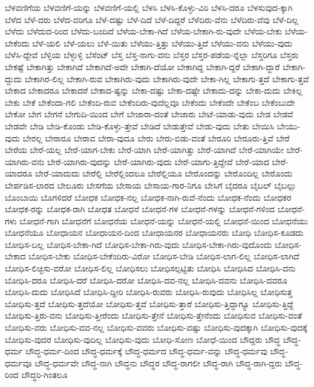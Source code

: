 {ಬೆಳವಣಿಗೆಯ
ಬೆಳವಣಿಗೆ-ಯನ್ನು
ಬೆಳವಣಿಗೆ-ಯಲ್ಲಿ
ಬೆಳಸಿ
ಬೆಳಸಿ-ಕೊಳ್ಳು-ವಿರಿ
ಬೆಳಸಿ-ದರೂ
ಬೆಳಸುವುದ-ಕ್ಕಾಗಿ
ಬೆಳೆದ
ಬೆಳೆ-ದರು
ಬೆಳೆದ-ವರಿಗೂ
ಬೆಳೆ-ದಷ್ಟು
ಬೆಳೆ-ದಿದೆ
ಬೆಳೆ-ದಿದ್ದರೆ
ಬೆಳೆದಿರು-ವೆನು
ಬೆಳೆದಿರು-ವೆವು
ಬೆಳೆ-ದಿಲ್ಲ
ಬೆಳೆದು
ಬೆಳೆದುದ-ರಿಂದ
ಬೆಳೆದು-ಬಂದಿದೆ
ಬೆಳೆಯ-ಬೇಕಾ-ಗಿದೆ
ಬೆಳೆಯ-ಬೇಕಾಗಿ-ರು-ವುದೇ
ಬೆಳೆಯ-ಬೇಕು
ಬೆಳೆಯ-ಬೇಕೆಂದು
ಬೆಳೆ-ಯಲಿ
ಬೆಳೆ-ಯಲು
ಬೆಳೆ-ಯಿತು
ಬೆಳೆಯು-ತ್ತಿತ್ತು
ಬೆಳೆಯು-ತ್ತಿದೆ
ಬೆಳೆಯು-ವನು
ಬೆಳೆಯು-ವುದು
ಬೆಳೆಸಿ-ದ್ದೇವೆ
ಬೆಳ್ಳಿಯ
ಬೆಳ್ಳುಳ್ಳಿ
ಬೆಸೆಂಟ್
ಬೆಸ್ತ
ಬೆಸ್ತ-ನಾಗು-ವನು
ಬೆಸ್ತರ
ಬೆಸ್ತರ-ಪಡೆಯ-ನ್ನೆಲ್ಲಾ
ಬೆಸ್ತರಿಗೂ
ಬೆಸ್ತರು
ಬೇಕಷ್ಟೆ
ಬೇಕಾಗಿತ್ತು
ಬೇಕಾಗಿದೆ
ಬೇಕಾಗಿದೆ-ಅದೇ
ಬೇಕಾಗಿ-ದೆಯೋ
ಬೇಕಾಗಿದ್ದ
ಬೇಕಾಗಿ-ದ್ದರೆ
ಬೇಕಾಗಿ-ದ್ದಾರೆ
ಬೇಕಾಗಿ-ದ್ದುದು
ಬೇಕಾಗಿರ-ಲಿಲ್ಲ
ಬೇಕಾಗಿ-ರುವ
ಬೇಕಾಗಿರು-ವುದು
ಬೇಕಾಗಿರು-ವುದೇ
ಬೇಕಾ-ಗಿಲ್ಲ
ಬೇಕಾಗು-ತ್ತದೆ
ಬೇಕಾಗು-ತ್ತವೆ
ಬೇಕಾದ
ಬೇಕಾದರೂ
ಬೇಕಾದರೆ
ಬೇಕಾದ-ಷ್ಟನ್ನು
ಬೇಕಾ-ದಷ್ಟು
ಬೇಕಾ-ದಷ್ಟೇ
ಬೇಕಾದು-ದನ್ನು
ಬೇಕಾ-ದುದು
ಬೇಕಿಲ್ಲ
ಬೇಕು
ಬೇಕೆ
ಬೇಕೆಂದಾ-ಗಲಿ
ಬೇಕೆಂದಿ-ರುವ
ಬೇಕೆಂದಿರು-ವುದೆಲ್ಲವೂ
ಬೇಕೆಂದು
ಬೇಕೆಂದೇ
ಬೇಕೆಂಬ
ಬೇಕೆಂಬುದೇ
ಬೇಕೋ
ಬೇಗ
ಬೇಗನೆ
ಬೇಗುದಿ-ಯಿಂದ
ಬೇಗೆ
ಬೇಜಾರಾ-ದಂತೆ
ಬೇಜಾರು
ಬೇಟೆ-ಯಾಡು-ವುದು
ಬೇಡ
ಬೇಡವೆ
ಬೇಡವೇ
ಬೇಡಿ
ಬೇಡಿ-ಕೊಂಡು
ಬೇಡಿ-ಕೊಳ್ಳು-ತ್ತೇವೆ
ಬೇಡಿದೆ
ಬೇಡುತ್ತೇವೆ
ಬೇಡು-ವುದು
ಬೇತು
ಬೇಯಿಸಿ
ಬೇಯು-ವುದು
ಬೇರಲ್ಲ
ಬೇರಾರೂ
ಬೇರಾವ
ಬೇರಾ-ವುದೂ
ಬೇರು
ಬೇರು-ಬಿಡು-ವಂತೆ
ಬೇರೂರಿ
ಬೇರೂರು-ತ್ತಿವೆ
ಬೇರೆ
ಬೇರೆಯ
ಬೇರೆ-ಯಲ್ಲ
ಬೇರೆ-ಯಾಗ-ಬೇಕು
ಬೇರೆ-ಯಾಗಿ
ಬೇರೆ-ಯಾಗಿತ್ತು
ಬೇರೆ-ಯಾಗಿದೆ
ಬೇರೆ-ಯಾಗಿಯೇ
ಬೇರೆ-ಯಾಗಿರು-ವನು
ಬೇರೆ-ಯಾಗಿರು-ವುದನ್ನು
ಬೇರೆ-ಯಾಗಿರು-ವುದು
ಬೇರೆ-ಯಾಗು-ತ್ತಿದ್ದೇವೆ
ಬೇರೆ-ಯಾದ
ಬೇರೆ-ಯಾದರೂ
ಬೇರೆ-ಯಾದುದು
ಬೇರೆಲ್ಲಿ
ಬೇರೆಲ್ಲಿಂದಲೂ
ಬೇರೆಲ್ಲಿಯೂ
ಬೇರೊಂದನ್ನು
ಬೇರೊಂದಿಲ್ಲ
ಬೇರೊಂದು
ಬೇರ್ಪಡಿಸ-ಲಾರದ
ಬೇಲೂರು
ಬೇಸಗೆಯ
ಬೇಸಾಯ
ಬೇಸಾಯ-ಗಾರ-ನಿಗೂ
ಬೇಸಿಗೆ
ಬೈದರೂ
ಬೈಬಲ್
ಬೈಬಲ್ಲು
ಬೊಂಬಾಯಿ
ಬೊಗಳಿದರೆ
ಬೋಧಕ
ಬೋಧಕ-ನಲ್ಲ
ಬೋಧಕ-ನಾಗಿ-ರುವೆ-ನೆಂದು
ಬೋಧಕ-ನೆಂದು
ಬೋಧಕರ
ಬೋಧಕ-ರನ್ನು
ಬೋಧಕ-ರಾಗಿ
ಬೋಧತ
ಬೋಧನೆ
ಬೋಧನೆ-ಗಳ
ಬೋಧನೆ-ಗಳನ್ನು
ಬೋಧನೆ-ಗಳಿಂದ
ಬೋಧನೆ-ಗಳು
ಬೋಧನೆ-ಗಾಗಿ
ಬೋಧನೆಗೆ
ಬೋಧನೆಯ
ಬೋಧನೆ-ಯನ್ನು
ಬೋಧನೆ-ಯಲ್ಲಿ
ಬೋಧನೆ-ಯಿಂದ
ಬೋಧನೆಯು
ಬೋಧನೆಯೂ
ಬೋಧಾಯನ
ಬೋಧಾಯನ-ದಿಂದ
ಬೋಧಾಯನರ
ಬೋಧಾಯನರು
ಬೋಧಿ
ಬೋಧಿಸ-ಕೂಡದು
ಬೋಧಿಸ-ಬಲ್ಲ
ಬೋಧಿಸ-ಬೇಕಾ-ಗಿದೆ
ಬೋಧಿಸ-ಬೇಕಾ-ಗಿರು-ವುದು
ಬೋಧಿಸ-ಬೇಕಾ-ಗಿರು-ವುದೊಂದು
ಬೋಧಿಸ-ಬೇಕಾದ
ಬೋಧಿಸ-ಬೇಕು
ಬೋಧಿಸ-ಬೇಕೆಂದಿರು-ವಿರೋ
ಬೋಧಿಸ-ಬೇಡಿ
ಬೋಧಿಸ-ಲಾಗ-ಲಿಲ್ಲ
ಬೋಧಿಸ-ಲಾಗಿದೆ
ಬೋಧಿಸ-ಲಿಚ್ಛಿಸು-ವರೋ
ಬೋಧಿಸ-ಲಿಲ್ಲ
ಬೋಧಿಸಲು
ಬೋಧಿಸಲ್ಪಟ್ಟಿತು
ಬೋಧಿಸಿ
ಬೋಧಿಸಿದ
ಬೋಧಿಸಿ-ದನು
ಬೋಧಿಸಿ-ದರೂ
ಬೋಧಿಸಿ-ದರೆ
ಬೋಧಿಸಿ-ದರೋ
ಬೋಧಿಸಿ-ದವ-ನಲ್ಲ
ಬೋಧಿಸಿ-ದವನು
ಬೋಧಿಸಿ-ದವರೂ
ಬೋಧಿಸಿ-ದುದು
ಬೋಧಿಸಿದೆ
ಬೋಧಿಸಿ-ದ್ದೀರಿ
ಬೋಧಿಸಿ-ರುವರು
ಬೋಧಿಸಿ-ರುವುದು
ಬೋಧಿಸಿಲ್ಲ
ಬೋಧಿಸುತ್ತ
ಬೋಧಿಸು-ತ್ತದೆ
ಬೋಧಿಸು-ತ್ತದೆಯೋ
ಬೋಧಿಸು-ತ್ತವೆ
ಬೋಧಿಸು-ತ್ತಾರೆ
ಬೋಧಿಸು-ತ್ತಿದ್ದಾಗ್ಯೂ
ಬೋಧಿಸು-ತ್ತಿದ್ದೆ
ಬೋಧಿಸು-ತ್ತಿರು-ವನು
ಬೋಧಿಸು-ತ್ತೀರೆಂದು
ಬೋಧಿಸು-ತ್ತೇನೆ
ಬೋಧಿಸು-ತ್ತೇನೆಂದು
ಬೋಧಿಸುವ
ಬೋಧಿಸು-ವಂತೆ
ಬೋಧಿಸು-ವರು
ಬೋಧಿಸು-ವವ-ನಲ್ಲ
ಬೋಧಿಸು-ವವರು
ಬೋಧಿಸು-ವಷ್ಟು
ಬೋಧಿಸು-ವುದಕ್ಕಾಗಿ
ಬೋಧಿಸು-ವುದಕ್ಕೆ
ಬೋಧಿಸು-ವುದರ
ಬೋಧಿಸು-ವುದಿಲ್ಲ
ಬೋಧಿಸು-ವುದು
ಬೋಧಿ-ಸೋಣ
ಬೋಧೆ-ಯಿಂದ
ಬೌದ್ದರು
ಬೌದ್ಧ
ಬೌದ್ಧ-ಧರ್ಮ
ಬೌದ್ಧ-ಧರ್ಮ-ದಿಂದ
ಬೌದ್ಧ-ಧರ್ಮಕ್ಕೆ
ಬೌದ್ಧ-ಧರ್ಮದ
ಬೌದ್ಧ-ಧರ್ಮ-ವನ್ನು
ಬೌದ್ಧ-ಧರ್ಮವು
ಬೌದ್ಧ-ಧರ್ಮವೂ
ಬೌದ್ಧ-ಧರ್ಮವೇ
ಬೌದ್ಧ-ನಾಗಿ
ಬೌದ್ಧನು
ಬೌದ್ಧರ
ಬೌದ್ಧ-ರಾಗಲೀ
ಬೌದ್ಧ-ರಾಗಿ
ಬೌದ್ಧ-ರಾಗಿ-ದ್ದರು
ಬೌದ್ಧ-ರಿಂದ
ಬೌದ್ಧರಿ-ಗಿಂತಲೂ
}
